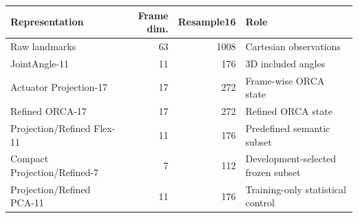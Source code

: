\begin{tabular}{lrrl}
\toprule
Representation & Frame dim. & Resample16 & Role \\
\midrule
Raw landmarks & 63 & 1008 & Cartesian observations \\
JointAngle-11 & 11 & 176 & 3D included angles \\
Actuator Projection-17 & 17 & 272 & Frame-wise ORCA state \\
Refined ORCA-17 & 17 & 272 & Refined ORCA state \\
Projection/Refined Flex-11 & 11 & 176 & Predefined semantic subset \\
Compact Projection/Refined-7 & 7 & 112 & Development-selected frozen subset \\
Projection/Refined PCA-11 & 11 & 176 & Training-only statistical control \\
\bottomrule
\end{tabular}
